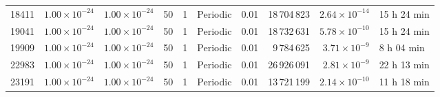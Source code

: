 \begin{landscape}
\begin{table}[p]
{\begin{tabular}{rrrrrlrrrl}
18411 & $1.00\times 10^{-24}$ & $1.00\times 10^{-24}$ & 50 & 1 & Periodic & 0.01 & 18\,704\,823 & $2.64\times 10^{-14}$ & 15 h 24 min \\
19041 & $1.00\times 10^{-24}$ & $1.00\times 10^{-24}$ & 50 & 1 & Periodic & 0.01 & 18\,732\,631 & $5.78\times 10^{-10}$ & 15 h 24 min \\
19909 & $1.00\times 10^{-24}$ & $1.00\times 10^{-24}$ & 50 & 1 & Periodic & 0.01 & 9\,784\,625 & $3.71\times 10^{-9}$ & 8 h 04 min \\
22983 & $1.00\times 10^{-24}$ & $1.00\times 10^{-24}$ & 50 & 1 & Periodic & 0.01 & 26\,926\,091 & $2.81\times 10^{-9}$ & 22 h 13 min \\
23191 & $1.00\times 10^{-24}$ & $1.00\times 10^{-24}$ & 50 & 1 & Periodic & 0.01 & 13\,721\,199 & $2.14\times 10^{-10}$ & 11 h 18 min \\
\bottomrule
\end{tabular}%
}
\end{table}
\end{landscape}
